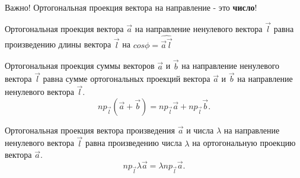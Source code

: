 \begin{note}
  Важно! Ортогональная проекция вектора на направление - это \textbf{число}!
\end{note}

\begin{theorem}
  Ортогональная проекция вектора $\vec{a}$ на направление ненулевого вектора $\vec{l}$ равна произведению длины вектора $\vec{l}$ на $cos \phi = \widehat{\vec{a}\vec{l}}$
\end{theorem}

\begin{theorem}
  Ортогональная проекция суммы векторов $\vec{a}$ и $\vec{b}$ на направление ненулевого вектора $\vec{l}$ равна сумме ортогональных проекций вектора $\vec{a}$ и $\vec{b}$ на направление ненулевого вектора $\vec{l}$.
  \[
    np_{\vec{l}}\left( \vec{a} + \vec{b} \right) = np_{\vec{l}}\vec{a} + np_{\vec{l}}\vec{b}
  .\] 
\end{theorem}

\begin{theorem}
  Ортогональная проекция вектора произведения $\vec{a}$ и числа $\lambda$ на направление ненулевого вектора $\vec{l}$ равна произведению числа $\lambda$ на ортогональную проекцию вектора $\vec{a}$.
  \[
    np_{\vec{l}} \lambda\vec{a} = \lambda np_{\vec{l}} \vec{a}
  .\] 
\end{theorem}

